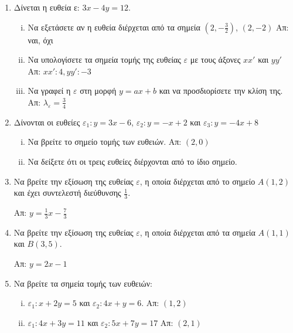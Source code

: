 


\everymath{\displaystyle}
\pagestyle{vangelis}



\begin{center}
  \minibox{\large\bfseries \textcolor{Col1}{Ευθείες}}
\end{center}

\vspace{\baselineskip}

\begin{enumerate}
  \item  Δίνεται η ευθεία ε:  $ 3x - 4y = 12 $.
    \begin{enumerate}[i)]
      \item Να εξετάσετε αν η ευθεία διέρχεται από τα σημεία $\left(2,- \frac{3}{2}
        \right)$, $ (2,-2) $ \hfill Απ:  ναι, όχι 
      \item  Να υπολογίσετε τα σημεία τομής της ευθείας $ \varepsilon $  
        με τους άξονες  $ xx' $  και  $ yy' $ \hfill Απ: $ xx': 4, yy':-3 $ 
      \item Να γραφεί η $ \varepsilon $ στη μορφή $ y=ax+b $ και να 
        προσδιορίσετε την κλίση της. 
        \hfill Απ: $ \lambda_{\varepsilon} = \frac{3}{4} $ 
    \end{enumerate}

  \item  Δίνονται οι ευθείες $ \varepsilon_1: y = 3x-6 $, 
    $ \varepsilon_2: y = -x+2 $  και $ \varepsilon_3:   y = -4x+8 $
    \begin{enumerate}[i)]
      \item  Να βρείτε το σημείο τομής των ευθειών.  \hfill Απ: $ (2,0) $
      \item  Να δείξετε ότι οι τρεις ευθείες διέρχονται από το ίδιο σημείο.
    \end{enumerate}

  \item  Να βρείτε την εξίσωση της ευθείας  $ \varepsilon $, η οποία διέρχεται 
    από το σημείο  $ A(1,2) $ και έχει συντελεστή διεύθυνσης $ \frac{1}{3} $.

    \hfill Απ: $ y = \frac{1}{3} x - \frac{7}{3} $ 

  \item  Να βρείτε την εξίσωση της ευθείας  $\varepsilon$, η οποία διέρχεται από τα σημεία  $
    A(1,1) $  και  $ B(3,5) $. 

    \hfill Απ: $ y=2x-1 $ 

  \item  Να βρείτε τα  σημεία τομής των ευθειών:
    \begin{enumerate}[i)]
      \item $ \varepsilon_{1}: x + 2y = 5 $   και  $\varepsilon_{2}: 4x + y = 6 $.
        \hfill Απ: $ (1,2) $ 
      \item $ \varepsilon_{1}: 4x+3y=11 $ και  $ \varepsilon_{2}: 5x+7y=17 $ \hfill Απ: $
        (2,1) $ 
    \end{enumerate}



\end{enumerate}
